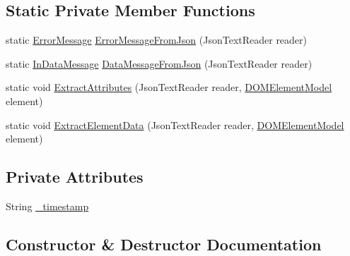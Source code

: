 \subsection*{Static Private Member Functions}
\begin{DoxyCompactItemize}
\item 
static \hyperlink{class_web_analyzer_1_1_models_1_1_message_model_1_1_error_message}{Error\+Message} \hyperlink{class_web_analyzer_1_1_models_1_1_message_model_1_1_message_a8a0c7229b12b93ecea85d87799507906}{Error\+Message\+From\+Json} (Json\+Text\+Reader reader)
\item 
static \hyperlink{class_web_analyzer_1_1_models_1_1_message_model_1_1_in_data_message}{In\+Data\+Message} \hyperlink{class_web_analyzer_1_1_models_1_1_message_model_1_1_message_a09f5ab44d912bea7b3ae5e2a78eab490}{Data\+Message\+From\+Json} (Json\+Text\+Reader reader)
\item 
static void \hyperlink{class_web_analyzer_1_1_models_1_1_message_model_1_1_message_a9a2024f67011c88f2d831c4749d8ea06}{Extract\+Attributes} (Json\+Text\+Reader reader, \hyperlink{class_web_analyzer_1_1_models_1_1_data_model_1_1_d_o_m_element_model}{D\+O\+M\+Element\+Model} element)
\item 
static void \hyperlink{class_web_analyzer_1_1_models_1_1_message_model_1_1_message_a8b1248666d8a8c1819b0920f1960f054}{Extract\+Element\+Data} (Json\+Text\+Reader reader, \hyperlink{class_web_analyzer_1_1_models_1_1_data_model_1_1_d_o_m_element_model}{D\+O\+M\+Element\+Model} element)
\end{DoxyCompactItemize}
\subsection*{Private Attributes}
\begin{DoxyCompactItemize}
\item 
String \hyperlink{class_web_analyzer_1_1_models_1_1_message_model_1_1_message_ae1e243f35e213e08ec2bdc54f64b0d2e}{\+\_\+timestamp}
\end{DoxyCompactItemize}


\subsection{Constructor \& Destructor Documentation}
\hypertarget{class_web_analyzer_1_1_models_1_1_message_model_1_1_message_ad1fc3e795c7af522dbf12792f621abfd}{}
